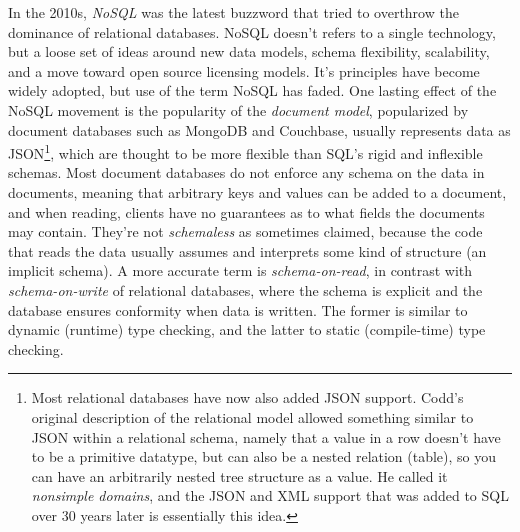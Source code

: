 \documentclass[table, xcdraw]{article}%
\begin{document}
In the 2010s, \textit{NoSQL} was the latest buzzword that tried to overthrow the dominance of relational databases. NoSQL doesn't refers to a single technology, but a loose set of ideas around new data models, schema flexibility, scalability, and a move toward open
source licensing models. It's principles have become widely adopted, but use of the term NoSQL has faded. One lasting effect of the NoSQL movement is the popularity of the \textit{document model}, popularized by document databases such as MongoDB and Couchbase, usually represents data as JSON\footnote{Most relational databases have now also added JSON support. Codd’s original description of the relational model allowed something similar to JSON within a relational schema, namely that a value in a row doesn’t have
to be a primitive datatype, but can also be a nested relation (table), so you can have an arbitrarily nested tree
structure as a value. He called it \textit{nonsimple domains}, and the JSON and XML support that was added to SQL over 30 years later is essentially this idea.}, which are thought to be more flexible than SQL's rigid and inflexible schemas. Most document databases do not enforce any schema on the data in documents, meaning that arbitrary keys and values can be added to a document, and when reading, clients have no guarantees as to what fields the documents may contain. They're not \textit{schemaless} as sometimes claimed, because the code that reads the data usually assumes and interprets some kind of structure (an implicit schema). A more accurate term is \textit{schema-on-read}, in contrast with \textit{schema-on-write} of relational databases, where the schema is explicit and the database ensures conformity when data is written. The former is similar to dynamic (runtime) type checking, and the latter to static (compile-time) type checking.
\end{document}
